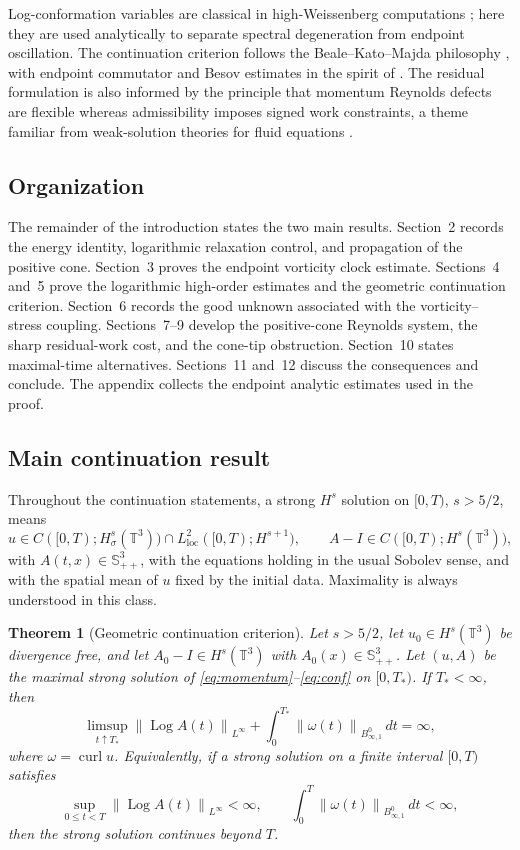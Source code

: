 \documentclass[10pt,a4paper]{amsart}
\numberwithin{equation}{section}
\newtheorem{theorem}{Theorem}[section]
\newcommand{\T}{\mathbb T}
\newcommand{\Id}{I}
\newcommand{\Spp}{\mathbb S_{++}}
\newcommand{\curl}{\operatorname{curl}}
\newcommand{\Log}{\operatorname{Log}}
\newcommand{\Besov}{B^0_{\infty,1}}
\newcommand{\norm}[1]{\left\lVert #1\right\rVert}
\begin{document}
Log-conformation variables are classical in high-Weissenberg computations
\cite{FattalKupferman}; here they are used analytically to separate spectral
degeneration from endpoint oscillation.  The continuation criterion follows
the Beale--Kato--Majda philosophy \cite{BKM}, with endpoint commutator and
Besov estimates in the spirit of \cite{KatoPonce,BCD}.  The residual
formulation is also informed by the principle that momentum Reynolds defects
are flexible whereas admissibility imposes signed work constraints, a theme
familiar from weak-solution theories for fluid equations
\cite{DeLellisSzekelyhidi}.

\subsection*{Organization}

The remainder of the introduction states the two main results.  Section~2
records the energy identity, logarithmic relaxation control, and propagation of
the positive cone.  Section~3 proves the endpoint vorticity clock estimate.
Sections~4 and~5 prove the logarithmic high-order estimates and the geometric
continuation criterion.  Section~6 records the good unknown associated with
the vorticity--stress coupling.  Sections~7--9 develop the positive-cone
Reynolds system, the sharp residual-work cost, and the cone-tip obstruction.
Section~10 states maximal-time alternatives.  Sections~11 and~12 discuss the
consequences and conclude.  The appendix collects the endpoint analytic
estimates used in the proof.
\subsection*{Main continuation result}

Throughout the continuation statements, a strong \(H^s\) solution on
\([0,T)\), \(s>5/2\), means
\[
  u\in C([0,T);H^s_\sigma(\T^3))\cap L^2_{\mathrm{loc}}([0,T);H^{s+1}),
  \qquad
  A-\Id\in C([0,T);H^s(\T^3)),
\]
with \(A(t,x)\in\Spp^3\), with the equations holding in the usual Sobolev
sense, and with the spatial mean of \(u\) fixed by the initial data.  Maximality
is always understood in this class.

\begin{theorem}[Geometric continuation criterion]
\label{thm:main}
Let \(s>5/2\), let \(u_0\in H^s(\T^3)\) be divergence free, and let
\(A_0-\Id\in H^s(\T^3)\) with \(A_0(x)\in\Spp^3\).  Let \((u,A)\) be the
maximal strong solution of \eqref{eq:momentum}--\eqref{eq:conf} on
\([0,T_*)\).  If \(T_*<\infty\), then
\begin{equation}
  \limsup_{t\uparrow T_*}\norm{\Log A(t)}_{L^\infty}
  +
  \int_0^{T_*}\norm{\omega(t)}_{\Besov}\,dt
  =\infty ,
  \label{eq:main-criterion}
\end{equation}
where \(\omega=\curl u\).  Equivalently, if a strong solution on a finite
interval \([0,T)\) satisfies
\[
  \sup_{0\le t<T}\norm{\Log A(t)}_{L^\infty}<\infty,
  \qquad
  \int_0^T\norm{\omega(t)}_{\Besov}\,dt<\infty,
\]
then the strong solution continues beyond \(T\).
\end{theorem}
\end{document}
